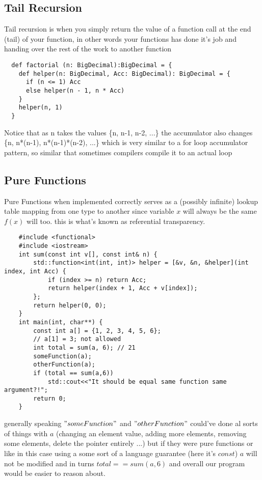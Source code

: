 \documentclass[conference]{IEEEtran}
\begin{document}
\subsection{Tail Recursion}
Tail recursion is when you simply return the value of a function call at the end (tail) of your function, in other words your functions has done it's job and handing over the rest of the work to another function
\begin{lstlisting}
  def factorial (n: BigDecimal):BigDecimal = {
    def helper(n: BigDecimal, Acc: BigDecimal): BigDecimal = {
      if (n <= 1) Acc
      else helper(n - 1, n * Acc)
    }
    helper(n, 1)
  }
\end{lstlisting}
Notice that as n takes the values \{n, n-1, n-2, ...\}
the accumulator also changes \{n, n*(n-1), n*(n-1)*(n-2), ...\}
which is very similar to a for loop accumulator pattern, so similar that sometimes compilers compile it to an actual loop


\subsection{Pure Functions}
Pure Functions when implemented correctly serves as a (possibly infinite) lookup table mapping from one type to another since variable $x$ will always be the same $f(x)$ will too. this is what's known as referential transparency.
\lstset{style=cpp}
\begin{lstlisting}
    #include <functional>
    #include <iostream>
    int sum(const int v[], const int& n) {
        std::function<int(int, int)> helper = [&v, &n, &helper](int index, int Acc) {
            if (index >= n) return Acc;
            return helper(index + 1, Acc + v[index]);
        };
        return helper(0, 0);
    }
    int main(int, char**) {
        const int a[] = {1, 2, 3, 4, 5, 6};
        // a[1] = 3; not allowed
        int total = sum(a, 6); // 21
        someFunction(a);
        otherFunction(a);
        if (total == sum(a,6))
            std::cout<<"It should be equal same function same argument?!";
        return 0;
    }
\end{lstlisting}
generally speaking $"someFunction"$ and $"otherFunction"$ could've done al sorts of things with $a$ (changing an element value, adding more elements, removing some elements, delete the pointer entirely ...) but if they were pure functions or like in this case using a some sort of a language guarantee (here it's $const$) $a$ will not be modified and in turns $total == sum(a,6)$ and overall our program would be easier to reason about.
\end{document}
